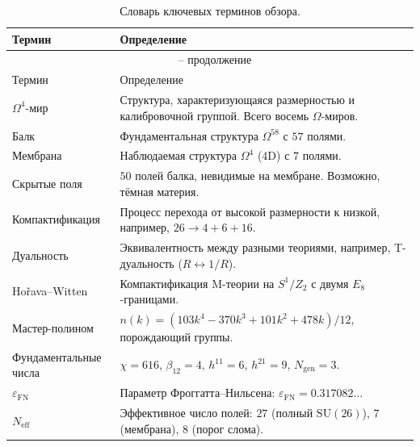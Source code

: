 \documentclass[11pt,a4paper]{article}
\newcommand{\SU}{\mathrm{SU}}
\newcommand{\Om}{\Omega^4}
\newcommand{\Omfi}{\Omega^{58}}
\newcommand{\Ngen}{N_{\text{gen}}}
\newcommand{\Neff}{N_{\text{eff}}}
\newcommand{\epsFN}{\varepsilon_{\text{FN}}}
\theoremstyle{definition}
\begin{document}
\begin{center}
\begin{longtable}{p{3.5cm}p{10cm}}
\caption{Словарь ключевых терминов обзора.}
\label{tab:app-glossary} \\
\toprule
Термин & Определение \\
\midrule
\endfirsthead
\multicolumn{2}{c}{{\tablename\ \thetable{} -- продолжение}} \\
\toprule
Термин & Определение \\
\midrule
\endhead
\bottomrule
\endfoot
\bottomrule
\endlastfoot

$\Om$-мир & 
    Структура, характеризующаяся размерностью и калибровочной 
    группой. Всего восемь $\Omega$-миров. \\[0.3em]

Балк & 
    Фундаментальная структура $\Omfi$ с $57$ полями. \\[0.3em]

Мембрана & 
    Наблюдаемая структура $\Om$ (4D) с $7$ полями. \\[0.3em]

Скрытые поля & 
    $50$ полей балка, невидимые на мембране. Возможно, тёмная 
    материя. \\[0.3em]

Компактификация & 
    Процесс перехода от высокой размерности к низкой, например, 
    $26 \to 4 + 6 + 16$. \\[0.3em]

Дуальность & 
    Эквивалентность между разными теориями, например, 
    T-дуальность ($R \leftrightarrow 1/R$). \\[0.3em]

Hořava--Witten & 
    Компактификация M-теории на $S^1/Z_2$ с двумя 
    $E_8$-границами. \\[0.3em]

Мастер-полином & 
    $n(k) = (103k^4 - 370k^3 + 101k^2 + 478k)/12$, 
    порождающий группы. \\[0.3em]

Фундаментальные числа & 
    $\chi = 616$, $\beta_{12} = 4$, $h^{11} = 6$, 
    $h^{21} = 9$, $\Ngen = 3$. \\[0.3em]

$\epsFN$ & 
    Параметр Фроггатта--Нильсена: 
    $\epsFN = 0.317082\ldots$ \\[0.3em]

$\Neff$ & 
    Эффективное число полей: $27$ (полный $\SU(26)$), 
    $7$ (мембрана), $8$ (порог слома). \\[0.3em]


\end{longtable}
\end{center}
\end{document}
